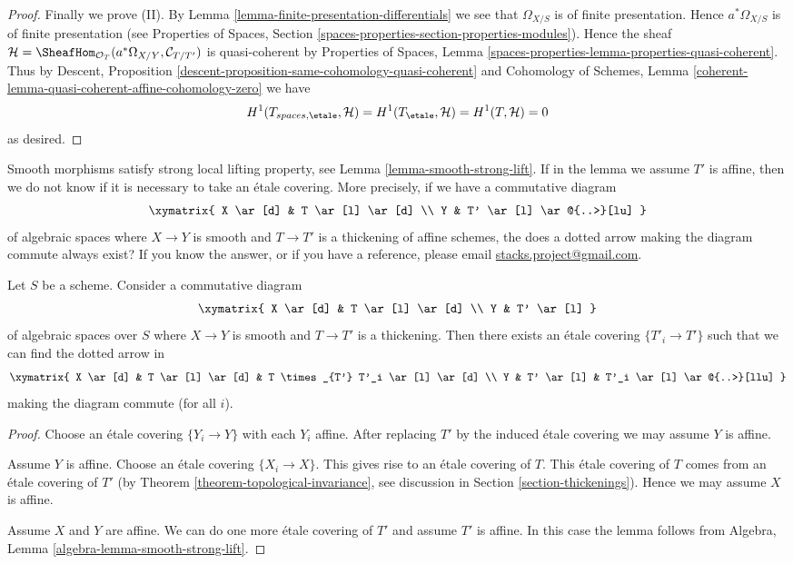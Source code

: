 \begin{proof}
\medskip\noindent
Finally we prove (II). By
Lemma \ref{lemma-finite-presentation-differentials}
we see that $\Omega_{X/S}$ is of finite presentation.
Hence $a^*\Omega_{X/S}$ is of finite presentation (see
Properties of Spaces,
Section \ref{spaces-properties-section-properties-modules}).
Hence the sheaf
$\mathcal{H} =
\SheafHom_{\mathcal{O}_T}(a^*\Omega_{X/Y}, \mathcal{C}_{T/T'})$
is quasi-coherent by
Properties of Spaces,
Lemma \ref{spaces-properties-lemma-properties-quasi-coherent}.
Thus by
Descent, Proposition \ref{descent-proposition-same-cohomology-quasi-coherent}
and Cohomology of Schemes, Lemma
\ref{coherent-lemma-quasi-coherent-affine-cohomology-zero}
we have
$$
H^1(T_{spaces, \etale}, \mathcal{H}) =
H^1(T_\etale, \mathcal{H}) =
H^1(T, \mathcal{H}) = 0
$$
as desired.
\end{proof}

\noindent
Smooth morphisms satisfy strong local lifting property, see
Lemma \ref{lemma-smooth-strong-lift}. If in the lemma we
assume $T'$ is affine, then
we do not know if it is necessary to take an \'etale covering.
More precisely, if we have a commutative diagram
$$
\xymatrix{
X \ar[d] & T \ar[l] \ar[d] \\
Y & T' \ar[l] \ar@{..>}[lu]
}
$$
of algebraic spaces where $X \to Y$ is smooth
and $T \to T'$ is a thickening of affine schemes,
the does a dotted arrow making the diagram commute
always exist? If you know the answer, or if you have a reference, please email
\href{mailto:stacks.project@gmail.com}{stacks.project@gmail.com}.

\begin{lemma}
\label{lemma-smooth-strong-lift}
Let $S$ be a scheme. Consider a commutative diagram
$$
\xymatrix{
X \ar[d] & T \ar[l] \ar[d] \\
Y & T' \ar[l]
}
$$
of algebraic spaces over $S$ where $X \to Y$ is smooth
and $T \to T'$ is a thickening. Then there exists an
\'etale covering $\{T'_i \to T'\}$ such that we
can find the dotted arrow in
$$
\xymatrix{
X \ar[d] & T \ar[l] \ar[d] & T \times_{T'} T'_i \ar[l] \ar[d] \\
Y & T' \ar[l] & T'_i \ar[l] \ar@{..>}[llu]
}
$$
making the diagram commute (for all $i$).
\end{lemma}

\begin{proof}
Choose an \'etale covering $\{Y_i \to Y\}$ with each $Y_i$ affine.
After replacing $T'$ by the induced \'etale covering we may assume
$Y$ is affine.

\medskip\noindent
Assume $Y$ is affine. Choose an \'etale covering $\{X_i \to X\}$.
This gives rise to an \'etale covering of $T$. This \'etale covering of $T$
comes from an \'etale covering of $T'$
(by Theorem \ref{theorem-topological-invariance}, see
discussion in Section \ref{section-thickenings}).
Hence we may assume $X$ is affine.

\medskip\noindent
Assume $X$ and $Y$ are affine. We can do one more \'etale covering of
$T'$ and assume $T'$ is affine. In this case the lemma follows from
Algebra, Lemma \ref{algebra-lemma-smooth-strong-lift}.
\end{proof}







